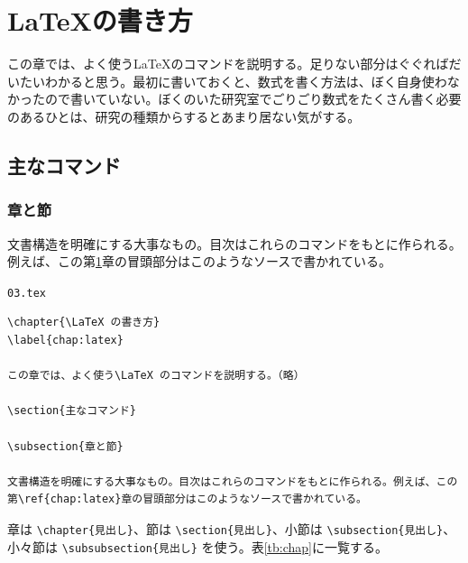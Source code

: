 \chapter{\LaTeX の書き方}
\label{chap:latex}

この章では、よく使う\LaTeX のコマンドを説明する。足りない部分はぐぐればだいたいわかると思う。最初に書いておくと、数式を書く方法は、ぼく自身使わなかったので書いていない。ぼくのいた研究室でごりごり数式をたくさん書く必要のあるひとは、研究の種類からするとあまり居ない気がする。

\section{主なコマンド}

\subsection{章と節}

文書構造を明確にする大事なもの。目次はこれらのコマンドをもとに作られる。例えば、この第\ref{chap:latex}章の冒頭部分はこのようなソースで書かれている。

\begin{itembox}[l]{{\tt 03.tex}}
\begin{verbatim}
\chapter{\LaTeX の書き方}
\label{chap:latex}

この章では、よく使う\LaTeX のコマンドを説明する。（略）

\section{主なコマンド}

\subsection{章と節}

文書構造を明確にする大事なもの。目次はこれらのコマンドをもとに作られる。例えば、この第\ref{chap:latex}章の冒頭部分はこのようなソースで書かれている。
\end{verbatim}
\end{itembox}

章は \verb|\chapter{見出し}|、節は \verb|\section{見出し}|、小節は \verb|\subsection{見出し}|、小々節は \verb|\subsubsection{見出し}| を使う。表\ref{tb:chap}に一覧する。

